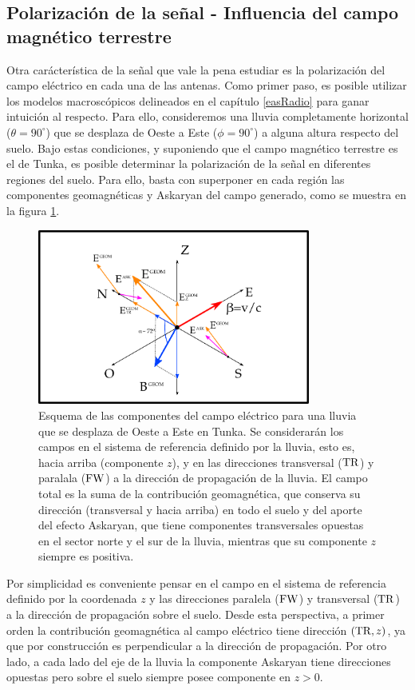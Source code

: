 	\subsection{Polarización de la señal - Influencia del campo magn\'etico terrestre}
	
	Otra car\'acter\'istica de la se\~nal que vale la pena estudiar es la polarizaci\'on del campo el\'ectrico en cada una de las antenas.
	Como primer paso, es posible utilizar los modelos macrosc\'opicos delineados en el cap\'itulo \ref{easRadio} para ganar intuici\'on al respecto. 
	Para ello, consideremos una lluvia completamente horizontal ($\theta=90^\circ$) que se desplaza de Oeste a Este ($\phi=90^\circ$) a alguna altura respecto del suelo.
	Bajo estas condiciones, y suponiendo que el campo magn\'etico terrestre es el de Tunka, es posible determinar la polarizaci\'on de la se\~nal en diferentes regiones del suelo.
	Para ello, basta con superponer en cada regi\'on las componentes geomagn\'eticas y Askaryan del campo generado, como se muestra en la figura \ref{fig:malField}.
	\begin{figure}[ht!]
		\centering
		\includegraphics[width=0.8\textwidth]{./fig/simulacionRadio/malField}
		\caption{\label{fig:malField}
		Esquema de las componentes del campo el\'ectrico para una lluvia que se desplaza de Oeste a Este en Tunka. Se considerarán los campos en el sistema de referencia definido por la lluvia, esto es, hacia arriba (componente $z$), y en las direcciones transversal (${\rm TR}$) y paralala (${\rm FW}$) a la dirección de propagación de la lluvia.
		El campo total es la suma de la contribución geomagnética, que conserva su dirección (transversal y hacia arriba) en todo el suelo y del aporte del efecto Askaryan, que tiene componentes transversales opuestas en el sector norte y el sur de la lluvia, mientras que su componente $z$ siempre es positiva.
		}
	\end{figure}
	Por simplicidad es conveniente pensar en el campo en el sistema de referencia definido por la coordenada $z$ y las direcciones paralela (${\rm FW}$) y transversal (${\rm TR}$) a la dirección de propagación sobre el suelo.
	Desde esta perspectiva, a primer orden la contribución geomagnética al campo eléctrico tiene dirección $({\rm TR},z)$, ya que por construcción es perpendicular a la dirección de propagación.
	Por otro lado, a cada lado del eje de la lluvia la componente Askaryan tiene direcciones opuestas pero sobre el suelo siempre posee componente en $z>0$.
	
